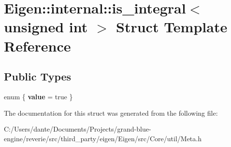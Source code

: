 \hypertarget{struct_eigen_1_1internal_1_1is__integral_3_01unsigned_01int_01_4}{}\section{Eigen\+::internal\+::is\+\_\+integral$<$ unsigned int $>$ Struct Template Reference}
\label{struct_eigen_1_1internal_1_1is__integral_3_01unsigned_01int_01_4}
\subsection*{Public Types}
\begin{DoxyCompactItemize}
\item 
\mbox{\label{struct_eigen_1_1internal_1_1is__integral_3_01unsigned_01int_01_4_ad0f54a9cf0944a05a5bd5f943150adef}} 
enum \{ {\bfseries value} = true
 \}
\end{DoxyCompactItemize}


The documentation for this struct was generated from the following file\+:\begin{DoxyCompactItemize}
\item 
C\+:/\+Users/dante/\+Documents/\+Projects/grand-\/blue-\/engine/reverie/src/third\+\_\+party/eigen/\+Eigen/src/\+Core/util/Meta.\+h\end{DoxyCompactItemize}
